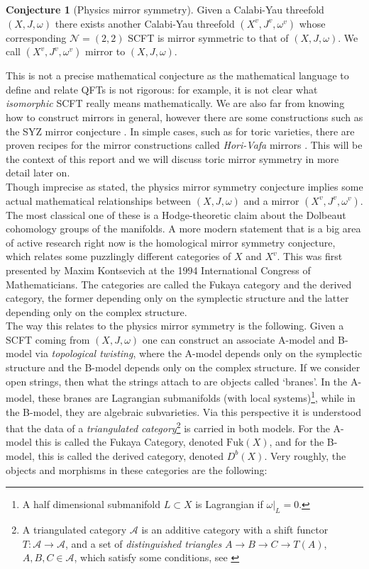 \documentclass[oneside]{amsart}
\theoremstyle{definition}
\theoremstyle{definition}
\newtheorem{conjecture}{Conjecture}[section]
\theoremstyle{definition}
\theoremstyle{definition}
\begin{document}
\begin{conjecture}[Physics mirror symmetry]
Given a Calabi-Yau threefold $(X, J, \omega)$ there exists
another Calabi-Yau threefold $(X^{v}, J^{v}, \omega^{v})$ whose corresponding $\mathcal{N}=(2,2)$ SCFT is mirror symmetric to that of $(X, J, \omega)$. We call $(X^{v}, J^{v}, \omega^{v})$ mirror to $(X, J, \omega)$.
\end{conjecture}
\noindent
This is not a precise mathematical conjecture as the mathematical language to define and relate QFTs is not rigorous: for example, it is not clear what \textit{isomorphic} SCFT really means mathematically. We are also far from knowing how to construct mirrors in general, however there are some constructions such as the SYZ mirror conjecture \cite{syz}. In simple cases, such as for toric varieties, there are proven recipes for the mirror constructions called \textit{Hori-Vafa} mirrors \cite{horivafa}. This will be the context of this report and we will discuss toric mirror symmetry in more detail later on. \\
\newline
Though imprecise as stated, the physics mirror symmetry conjecture  implies some actual mathematical relationships between $(X, J, \omega)$ and a mirror $(X^{v}, J^{v}, \omega^{v})$. The most classical one of these is a Hodge-theoretic claim about the Dolbeaut cohomology groups of the manifolds. A more modern statement that is a big area of active research right now is the homological mirror symmetry conjecture, which relates some puzzlingly different categories of $X$ and $X^v$. This was first presented by Maxim Kontsevich at the 1994 International Congress of Mathematicians. The categories are called the Fukaya category and the derived category, the former depending only on the symplectic structure and the latter depending only on the complex structure. \\
\newline
The way this relates to the physics mirror symmetry is the following. Given a SCFT coming from $(X,J,\omega)$ one can construct an associate A-model and B-model via \textit{topological twisting}, where the A-model depends only on the symplectic structure and the B-model depends only on the complex structure. If we consider open strings, then what the strings attach to are objects called ‘branes’. In the A-model, these branes are Lagrangian submanifolds (with local systems)\footnote{A half dimensional submanifold $L \subset X$ is Lagrangian if $\omega|_{L} =0$.}, while in the B-model, they are algebraic subvarieties. Via this perspective it is understood that the data of a \textit{triangulated category}\footnote{A triangulated category $\mathcal{A}$ is an additive category with a shift functor $T:\mathcal{A} \to \mathcal{A}$, and a set of \textit{distinguished triangles} $A \to B \to C \to T(A) $, $A,B,C \in \mathcal{A}$, which satisfy some conditions, see \cite[Chapter 1]{huybrechts} } is carried in both models. For the A-model this is called the Fukaya Category, denoted $\text{Fuk}(X)$, and for the B-model, this is called the derived category, denoted $D^b(X)$. Very roughly, the objects and morphisms in these categories are the following:
\end{document}
